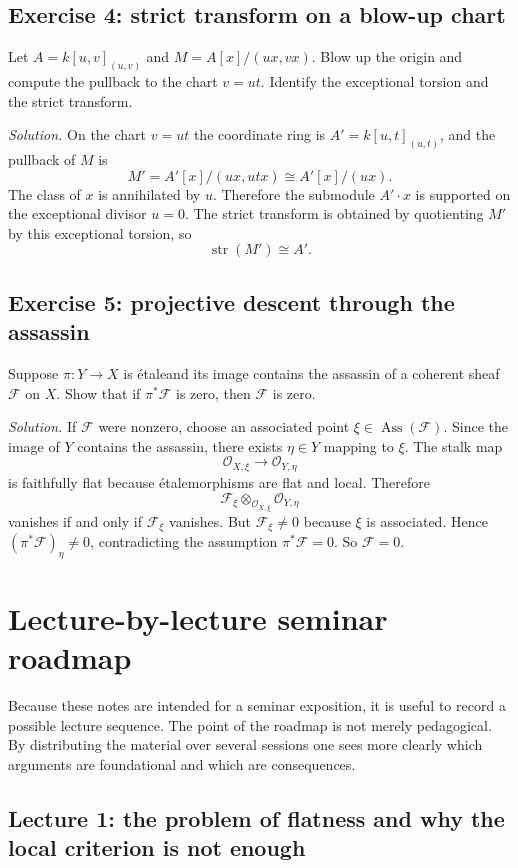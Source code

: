 \documentclass[11pt,oneside]{article}
\newcommand{\F}{\mathcal F}
\newcommand{\OO}{\mathcal O}
\newcommand{\Ass}{\operatorname{Ass}}
\newcommand{\ot}{\otimes}
\newcommand{\etale}{\'etale}
\newcommand{\st}{\operatorname{str}}
\begin{document}
\subsection*{Exercise 4: strict transform on a blow-up chart}

Let $A=k[u,v]_{(u,v)}$ and $M=A[x]/(ux,vx)$.  Blow up the origin and compute the pullback to the chart $v=ut$.  Identify the exceptional torsion and the strict transform.

\emph{Solution.}  On the chart $v=ut$ the coordinate ring is $A'=k[u,t]_{(u,t)}$, and the pullback of $M$ is
\[
M' = A'[x]/(ux,utx)\cong A'[x]/(ux).
\]
The class of $x$ is annihilated by $u$.  Therefore the submodule $A'\cdot x$ is supported on the exceptional divisor $u=0$.  The strict transform is obtained by quotienting $M'$ by this exceptional torsion, so
\[
\st(M')\cong A'.
\]

\subsection*{Exercise 5: projective descent through the assassin}

Suppose $\pi\colon Y\to X$ is \etale and its image contains the assassin of a coherent sheaf $\F$ on $X$.  Show that if $\pi^*\F$ is zero, then $\F$ is zero.

\emph{Solution.}  If $\F$ were nonzero, choose an associated point $\xi\in \Ass(\F)$.  Since the image of $Y$ contains the assassin, there exists $\eta\in Y$ mapping to $\xi$.  The stalk map
\[
\OO_{X,\xi}\longrightarrow \OO_{Y,\eta}
\]
is faithfully flat because \etale morphisms are flat and local.  Therefore
\[
\F_\xi\ot_{\OO_{X,\xi}} \OO_{Y,\eta}
\]
vanishes if and only if $\F_\xi$ vanishes.  But $\F_\xi\neq 0$ because $\xi$ is associated.  Hence $(\pi^*\F)_\eta\neq 0$, contradicting the assumption $\pi^*\F=0$.  So $\F=0$.


\section{Lecture-by-lecture seminar roadmap}

Because these notes are intended for a seminar exposition, it is useful to record a possible lecture sequence.  The point of the roadmap is not merely pedagogical.  By distributing the material over several sessions one sees more clearly which arguments are foundational and which are consequences.

\subsection*{Lecture 1: the problem of flatness and why the local criterion is not enough}
\end{document}
